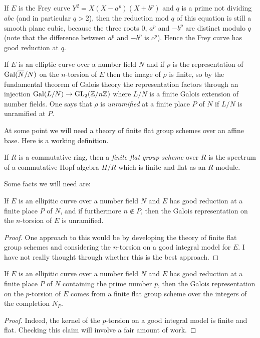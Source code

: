 \begin{corollary}
\begin{example} If $E$ is the Frey curve $Y^2=X(X-a^p)(X+b^p)$ and $q$ is a prime
  not dividing $abc$ (and in particular $q>2$), then the reduction mod $q$ of this 
  equation is still a smooth
  plane cubic, because the three roots $0$, $a^p$ and $-b^p$ are distinct modulo $q$
  (note that the difference between $a^p$ and $-b^p$ is $c^p$). Hence the Frey curve
  has good reduction at $q$.
\end{example}

If $E$ is an elliptic curve over a number field $N$ and if $\rho$ is the representation
of $\operatorname{Gal}(\overline{N}/N)$ on the $n$-torsion of $E$ then the image of $\rho$ is finite,
so by the fundamental theorem of Galois theory the representation factors through an
injection $\operatorname{Gal}(L/N)\to\operatorname{GL}_2(\mathbb{Z}/n\mathbb{Z})$ where $L/N$ is a finite Galois extension of
number fields. One says that $\rho$ is \emph{unramified} at a finite place $P$ of $N$
if $L/N$ is unramified at $P$.

At some point we will need a theory of finite flat group schemes over an affine base. Here
is a working definition.

\begin{definition}\label{finite_flat_group_scheme} If $R$ is a commutative ring, then
  a \emph{finite flat group scheme} over $R$ is the spectrum of a commutative Hopf algebra $H/R$ 
  which is finite and flat as an $R$-module.
\end{definition}

Some facts we will need are:

\begin{theorem}\label{good_reduction_implies_unramified} If $E$ is an ellipitic curve over a number 
  field $N$ and $E$ has good reduction at a finite place $P$ of $N$, and if furthermore 
  $n\not\in P$, then the Galois representation on the $n$-torsion of $E$ is unramified.
\end{theorem}
\begin{proof}
  One approach to this would be by developing the theory of finite flat group schemes
  and considering the $n$-torsion on a good integral model for $E$. I have not really thought
  through whether this is the best approach. 
\end{proof}

\begin{theorem}\label{good_reduction_implies_flat} If $E$ is an ellipitic curve over a number field 
  $N$ and $E$ has good reduction at a finite place $P$ of $N$ containing the prime number $p$, 
  then the Galois representation on the $p$-torsion of $E$ comes from a finite flat group scheme 
  over the integers of the completion $N_P$.
\end{theorem}
\begin{proof}
  Indeed, the kernel of the $p$-torsion on a good integral model is finite and flat.
  Checking this claim will involve a fair amount of work.
\end{proof}


\end{corollary}
